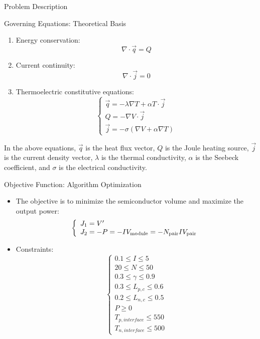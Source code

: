 \documentclass{beamer}
\begin{document}
\begin{frame}{Problem Description}
    \small
    \begin{block}{Governing Equations: Theoretical Basis}
        \begin{enumerate}
            \item Energy conservation: \[\nabla \cdot \vec{q} = Q\]
            \item Current continuity: \[\nabla \cdot \vec{j} = 0\]
            \item Thermoelectric constitutive equations: \[\left\{ \begin{array}{l}
\vec q =  - \lambda \nabla T + \alpha T \cdot \vec j\\
Q =  - \nabla V \cdot \vec j\\
\vec j =  - \sigma (\nabla V + \alpha \nabla T)
\end{array} \right.\]
        \end{enumerate}
    \end{block}
    In the above equations, \(\vec{q}\) is the heat flux vector, \(Q\) is the Joule heating source, \(\vec{j}\) is the current density vector, \(\lambda\) is the thermal conductivity, \(\alpha\) is the Seebeck coefficient, and \(\sigma\) is the electrical conductivity.
\end{frame}


\begin{frame}
    \begin{block}{Objective Function: Algorithm Optimization}
        \begin{itemize}
            \item The objective is to minimize the semiconductor volume and maximize the output power:
            \[
            \left\{ \begin{array}{l}
            {J_1} = V'\\
            {J_2} =  - P =  - I{V_{{\rm{module}}}} =  - {N_{{\rm{pair}}}}I{V_{{\rm{pair}}}}
            \end{array} \right.
            \]
            \item Constraints:
            \[
            \left\{
            \begin{array}{l}
            0.1 \leq I \leq 5 \\
            20 \leq N \leq 50 \\
            0.3 \leq \gamma \leq 0.9 \\
            0.3 \leq L_{p,c} \leq 0.6 \\
            0.2 \leq L_{n,c} \leq 0.5 \\
            P \geq 0 \\
            T_{p,interface} \leq 550 \\
            T_{n,interface} \leq 500
            \end{array}
            \right.
            \]
        \end{itemize}
    \end{block}
    
\end{frame}
    
\end{document}
